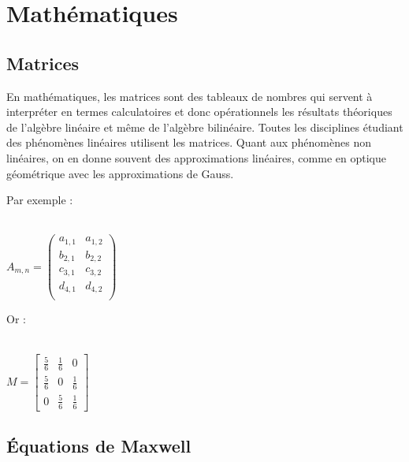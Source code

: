 \documentclass{article}
\begin{document}
\newpage

\section{Mathématiques}

\subsection{Matrices}



En mathématiques, les matrices sont des tableaux de nombres qui servent à interpréter en termes calculatoires et donc opérationnels les résultats théoriques de l'algèbre linéaire et même de l'algèbre bilinéaire. 
Toutes les disciplines étudiant des phénomènes linéaires utilisent les matrices. Quant aux phénomènes non linéaires, on en donne souvent des approximations linéaires, comme en optique géométrique avec les approximations de Gauss.

Par exemple :
\ \\ \ \\

\begin{center}

$
A_{m,n} = 
\begin{pmatrix}
a_{1,1} & a_{1,2} \\
b_{2,1} & b_{2,2} \\
c_{3,1} & c_{3,2} \\
d_{4,1} & d_{4,2} \\

\end{pmatrix} 
$
\end{center}

Or :
\ \\ \ \\

\begin{center}
$
M = \begin{bmatrix}
       \frac{5}{6} & \frac{1}{6} & 0           \\[0.3em]
       \frac{5}{6} & 0           & \frac{1}{6} \\[0.3em]
       0           & \frac{5}{6} & \frac{1}{6}
     \end{bmatrix}
$
\end{center}

\newpage

\subsection{Équations de Maxwell}
\end{document}
